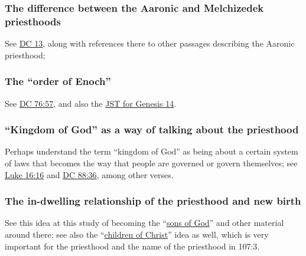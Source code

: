 	\subsubsection{The difference between the Aaronic and Melchizedek priesthoods}
		\label{PRIESTHOOD-difference}
		
		See \hyperref[DC13-1]{DC 13}, along with references there to other passages describing the Aaronic priesthood;
		
	\subsubsection{The ``order of Enoch''}
		\label{PRIESTHOOD-enoch}
		
		See \hyperref[DC76-57]{DC 76:57}, and also the \hyperref[JST-OTR1-GENESIS-14]{JST for Genesis 14}.
		
	\subsubsection{``Kingdom of God'' as a way of talking about the priesthood}
		
		Perhaps understand the term ``kingdom of God'' as being about a certain system of laws that becomes the way that people are governed or govern themselves; see \hyperref[LUKE-16-16]{Luke 16:16} and \hyperref[DC88-36]{DC 88:36}, among other verses.
		
	\subsubsection{The in-dwelling relationship of the priesthood and new birth}
		
		See this idea at this study of becoming the ``\hyperref[NEWBIRTH-sons]{sons of God}'' and other material around there; see also the ``\hyperref[NEWBIRTH-children-christ]{children of Christ}'' idea as well, which is very important for the priesthood and the name of the priesthood in 107:3.